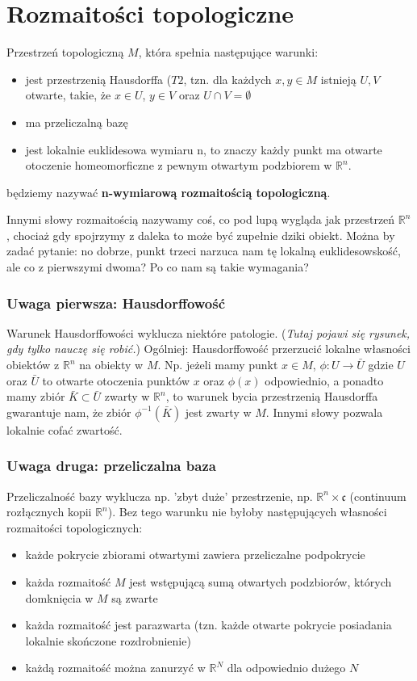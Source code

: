 \section{Rozmaitości topologiczne}
\begin{definition}
	Przestrzeń topologiczną $M$, która spełnia następujące warunki:
	\begin{itemize}
		\item jest przestrzenią Hausdorffa ($T2$, tzn. dla każdych $x,y \in M$ istnieją $U, V$ otwarte, takie, że $x \in U$, $y \in V$ oraz $U \cap V = \emptyset$
		\item ma przeliczalną bazę
		\item jest lokalnie euklidesowa wymiaru n, to znaczy każdy punkt ma otwarte otoczenie homeomorficzne z pewnym otwartym podzbiorem w $\mathbb{R}^n$.
	\end{itemize}
	będziemy nazywać \textbf{n-wymiarową rozmaitością topologiczną}.
\end{definition}

Innymi słowy rozmaitością nazywamy coś, co pod lupą wygląda jak przestrzeń $\mathbb{R}^n$, chociaż gdy spojrzymy z daleka to może być zupełnie dziki obiekt. Można by zadać pytanie: no dobrze, punkt trzeci narzuca nam tę lokalną euklidesowskość, ale co z pierwszymi dwoma? Po co nam są takie wymagania?

\subsubsection{Uwaga pierwsza: Hausdorffowość}
Warunek Hausdorffowości wyklucza niektóre patologie. (\textit{Tutaj pojawi się rysunek, gdy tylko nauczę się robić.}) Ogólniej: Hausdorffowość przerzucić lokalne własności obiektów z $\mathbb{R}^n$ na obiekty w $M$. Np. jeżeli mamy punkt $x \in M$, $\phi : U \to \bar{U}$  gdzie $U$ oraz $\bar{U}$ to otwarte otoczenia punktów $x$ oraz $\phi(x)$ odpowiednio, a ponadto mamy zbiór $\bar{K} \subset \bar{U}$ zwarty w $\mathbb{R}^n$, to warunek bycia przestrzenią Hausdorffa gwarantuje nam, że zbiór $\phi^{-1}\left(\bar{K}\right)$ jest zwarty w $M$. Innymi słowy pozwala lokalnie cofać zwartość.

\subsubsection{Uwaga druga: przeliczalna baza}
Przeliczalność bazy wyklucza np. 'zbyt duże' przestrzenie, np. $\mathbb{R}^n \times \mathfrak{c}$ (continuum rozłącznych kopii $\mathbb{R}^n$). Bez tego warunku nie byłoby następujących własności rozmaitości topologicznych:
\begin{itemize}
	\item każde pokrycie zbiorami otwartymi zawiera przeliczalne podpokrycie
	\item każda rozmaitość $M$ jest wstępującą sumą otwartych podzbiorów, których domknięcia w $M$ są zwarte
	\item każda rozmaitość jest parazwarta (tzn. każde otwarte pokrycie posiadania lokalnie skończone rozdrobnienie)
	\item każdą rozmaitość można zanurzyć w $\mathbb{R}^N$ dla odpowiednio dużego $N$
\end{itemize}

